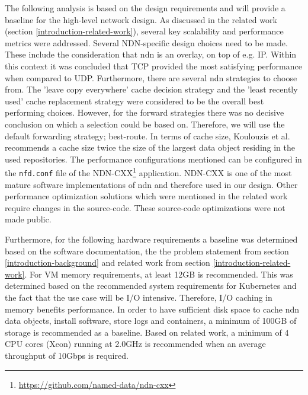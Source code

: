 The following analysis is based on the design requirements and will provide a baseline for the high-level network design. As discussed in the related work (section \ref{introduction-related-work}), several key scalability and performance metrics were addressed. Several NDN-specific design choices need to be made. These include the consideration that \gls{ndn} is an overlay, on top of e.g. IP. Within this context it was concluded that TCP provided the most satisfying performance when compared to UDP. Furthermore, there are several \gls{ndn} strategies to choose from. The 'leave copy everywhere' cache decision strategy and the 'least recently used' cache replacement strategy were considered to be the overall best performing choices. However, for the forward strategies there was no decisive conclusion on which a selection could be based on. Therefore, we will use the default forwarding strategy; best-route. In terms of cache size, Koulouzis et al. recommends a cache size twice the size of the largest data object residing in the used repositories. The performance configurations mentioned can be configured in the \texttt{nfd.conf} file of the NDN-CXX\footnote{\url{https://github.com/named-data/ndn-cxx}} application. NDN-CXX is one of the most mature software implementations of \gls{ndn} and therefore used in our design. Other performance optimization solutions which were mentioned in the related work require changes in the source-code. These source-code optimizations were not made public.

Furthermore, for the following hardware requirements a baseline was determined based on the software documentation, the the problem statement from section \ref{introduction-background} and related work from section \ref{introduction-related-work}. For VM memory requirements, at least 12GB is recommended. This was determined based on the recommended system requirements for Kubernetes \cite{kubernetes-system-requirements} and the fact that the use case will be I/O intensive. Therefore, I/O caching in memory benefits performance. In order to have sufficient disk space to cache \gls{ndn} data objects, install software, store logs and containers, a minimum of 100GB of storage is recommended as a baseline. Based on related work, a minimum of 4 CPU cores (Xeon) running at 2.0GHz is recommended when an average throughput of 10Gbps is required.

%

